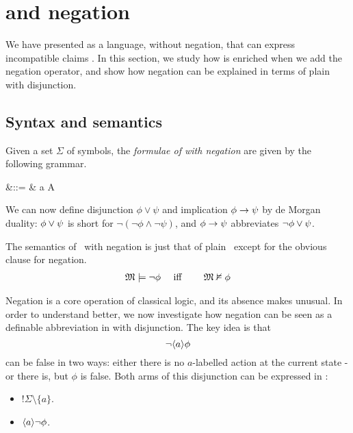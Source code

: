 \section{\Cathoristic{} and negation}\label{ELAndNegation}

\NI We have presented \cathoristic{} as a language, without negation, that can express incompatible claims .
In this section, we study how \cathoristic{}  is enriched when we add the negation operator, and show how negation
can be explained in terms of plain \cathoristic{} with disjunction.

\subsection{Syntax and semantics}

\begin{definition}
Given a set $\Sigma$ of symbols, the \emph{formulae of \cathoristic{}
  with negation} are given by the following grammar.
\begin{GRAMMAR}
  \phi 
     &\quad ::= \quad & 
   \top \fOr \bot \fOr \neg \phi \fOr \phi \land \psi \fOr \langle a \rangle \phi \fOr \fBang A 
\end{GRAMMAR}

\NI We can now define disjunction $\phi \lor \psi$ and implication
$\phi \rightarrow \psi$ by de Morgan duality: $\phi \lor \psi$ is short
for $\neg (\neg \phi \land \neg \psi )$, and $\phi \rightarrow \psi$  abbreviates
$\neg\phi \lor \psi$.
\end{definition}

The semantics of \cathoristic\ with negation is just that of plain
\cathoristic\, except for the obvious clause for negation.
\begin{eqnarray*}
\frak{M} \models \neg \phi &\quad\mbox{ iff }\quad& \frak{M} \nvDash \phi  
\end{eqnarray*}

\NI Negation is a core operation of classical logic, and its absence makes
\cathoristic{} unusual. In order to understand \cathoristic{} better, we
now investigate how negation can be seen as a definable abbreviation
in \cathoristic{} with disjunction. The key idea is that 
\[
   \neg \langle a \rangle \phi
\]
can be false in two ways: either there is no $a$-labelled action at the
current state - or there is, but $\phi$ is false. Both arms of this
disjunction can be expressed in \cathoristic{}:

\begin{itemize}

\item $!\Sigma \setminus \{a\}$.

\item $\langle a \rangle \neg \phi$.

\end{itemize}


